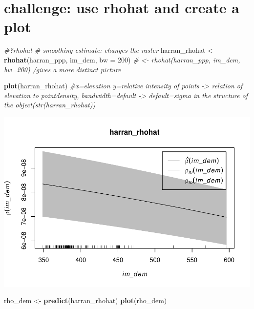 \documentclass[]{article}
\newenvironment{Shaded}{\begin{snugshade}}{\end{snugshade}}
\newcommand{\KeywordTok}[1]{\textcolor[rgb]{0.13,0.29,0.53}{\textbf{{#1}}}}
\newcommand{\DataTypeTok}[1]{\textcolor[rgb]{0.13,0.29,0.53}{{#1}}}
\newcommand{\DecValTok}[1]{\textcolor[rgb]{0.00,0.00,0.81}{{#1}}}
\newcommand{\StringTok}[1]{\textcolor[rgb]{0.31,0.60,0.02}{{#1}}}
\newcommand{\CommentTok}[1]{\textcolor[rgb]{0.56,0.35,0.01}{\textit{{#1}}}}
\newcommand{\NormalTok}[1]{{#1}}
\begin{document}
\section{challenge: use rhohat and create a
plot}\label{challenge-use-rhohat-and-create-a-plot}

\begin{Shaded}
\begin{Highlighting}[]
\CommentTok{#?rhohat # smoothing estimate: changes the raster}
\NormalTok{harran_rhohat <-}\StringTok{ }\KeywordTok{rhohat}\NormalTok{(harran_ppp, im_dem, }\DataTypeTok{bw =} \DecValTok{200}\NormalTok{)}
              \CommentTok{# <- rhohat(harran_ppp, im_dem, bw=200) /gives a more distinct picture}

\KeywordTok{plot}\NormalTok{(harran_rhohat) }\CommentTok{#x=elevation y=relative intensity of points -> relation of elevation to pointdensity, bandwidth=default -> default=sigma in the structure of the object(str(harran_rhohat))}
\end{Highlighting}
\end{Shaded}

\includegraphics{HarranPlain_files/figure-latex/unnamed-chunk-7-1.pdf}

\begin{Shaded}
\begin{Highlighting}[]
\NormalTok{rho_dem <-}\StringTok{ }\KeywordTok{predict}\NormalTok{(harran_rhohat)}
\KeywordTok{plot}\NormalTok{(rho_dem)}
\end{Highlighting}
\end{Shaded}
\end{document}
